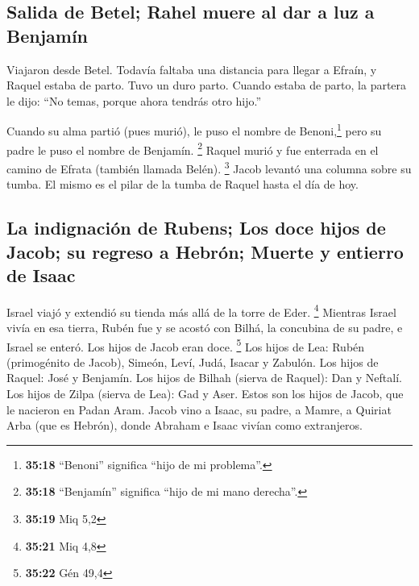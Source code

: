 \hypertarget{salida-de-betel-rahel-muere-al-dar-a-luz-a-benjamuxedn}{%
\subsection{Salida de Betel; Rahel muere al dar a luz a
Benjamín}\label{salida-de-betel-rahel-muere-al-dar-a-luz-a-benjamuxedn}}

 Viajaron desde Betel. Todavía faltaba una distancia para
llegar a Efraín, y Raquel estaba de parto. Tuvo un duro parto.
 Cuando estaba de parto, la partera le dijo: ``No temas,
porque ahora tendrás otro hijo.''

 Cuando su alma partió (pues murió), le puso el nombre de
Benoni,\footnote{\textbf{35:18} ``Benoni'' significa ``hijo de mi
  problema''.} pero su padre le puso el nombre de Benjamín. \footnote{\textbf{35:18}
  ``Benjamín'' significa ``hijo de mi mano derecha''.} 
Raquel murió y fue enterrada en el camino de Efrata (también llamada
Belén). \footnote{\textbf{35:19} Miq 5,2}  Jacob levantó
una columna sobre su tumba. El mismo es el pilar de la tumba de Raquel
hasta el día de hoy.

\hypertarget{la-indignaciuxf3n-de-rubens-los-doce-hijos-de-jacob-su-regreso-a-hebruxf3n-muerte-y-entierro-de-isaac}{%
\subsection{La indignación de Rubens; Los doce hijos de Jacob; su
regreso a Hebrón; Muerte y entierro de
Isaac}\label{la-indignaciuxf3n-de-rubens-los-doce-hijos-de-jacob-su-regreso-a-hebruxf3n-muerte-y-entierro-de-isaac}}

 Israel viajó y extendió su tienda más allá de la torre
de Eder. \footnote{\textbf{35:21} Miq 4,8}  Mientras
Israel vivía en esa tierra, Rubén fue y se acostó con Bilhá, la
concubina de su padre, e Israel se enteró. Los hijos de Jacob eran doce.
\footnote{\textbf{35:22} Gén 49,4}  Los hijos de Lea:
Rubén (primogénito de Jacob), Simeón, Leví, Judá, Isacar y Zabulón.
 Los hijos de Raquel: José y Benjamín. 
Los hijos de Bilhah (sierva de Raquel): Dan y Neftalí. 
Los hijos de Zilpa (sierva de Lea): Gad y Aser. Estos son los hijos de
Jacob, que le nacieron en Padan Aram.  Jacob vino a
Isaac, su padre, a Mamre, a Quiriat Arba (que es Hebrón), donde Abraham
e Isaac vivían como extranjeros.

